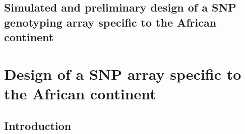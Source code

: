 \section{Simulated and preliminary design of a SNP genotyping array specific to the African continent}
\label{sec:chip_design}
\chapter{Design of a SNP array specific to the African continent}
\label{ch:chip_design}

\section{Introduction}

